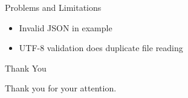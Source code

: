 \documentclass{beamer}
\begin{document}
\begin{frame}{Problems and Limitations}

    \begin{itemize}

        \item Invalid JSON in example

        \item UTF-8 validation does duplicate file reading

    \end{itemize}

\end{frame}

%

\begin{frame}{Thank You}
    \Huge{\centerline{Thank you for your attention.}}
\end{frame}

\end{document}
